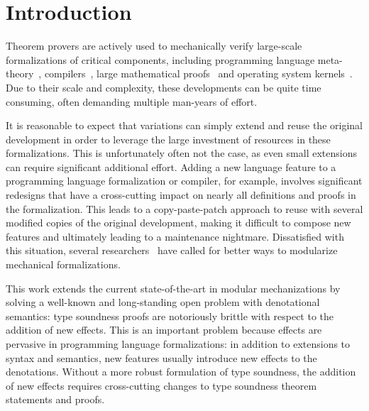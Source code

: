 \makeatother
\EndFmtInput
%

\section{Introduction}
\label{sec:intro}

Theorem provers are actively used to mechanically verify large-scale
formalizations of critical components, including programming language
meta-theory~\cite{poplmark}, compilers~\cite{leroy09cc}, large
mathematical proofs~\cite{gonthier13engineering} and operating system
kernels~\cite{klein10seL4}. Due to their scale and complexity, these
developments can be quite time consuming, often demanding multiple
man-years of effort.

It is reasonable to expect that variations can simply
extend and reuse the original development in order to leverage the
large investment of resources in these formalizations.
This is unfortunately often not the case, as even small extensions
can require significant additional effort.
Adding a new language feature to a programming language formalization or
compiler, for example, involves significant redesigns that
have a cross-cutting impact on nearly all definitions and proofs in the
formalization. This leads to a copy-paste-patch approach to reuse with
several modified copies of the original development, making it difficult to
compose new features and ultimately leading to a maintenance nightmare.
Dissatisfied with this situation, several
researchers~\cite{poplmark,shao10certified,stampoulis10VeriML,gonthier13engineering}
have called for better ways to modularize mechanical formalizations.

This work extends the current state-of-the-art in modular
mechanizations by solving a well-known and long-standing open problem
with denotational semantics: type soundness proofs are notoriously
brittle with respect to the addition of new effects. This is an
important problem because effects are pervasive in programming
language formalizations: in addition to extensions to syntax and
semantics, new features usually introduce new effects to the
denotations. Without a more robust formulation of type soundness, the
addition of new effects requires cross-cutting changes to type
soundness theorem statements and proofs.


